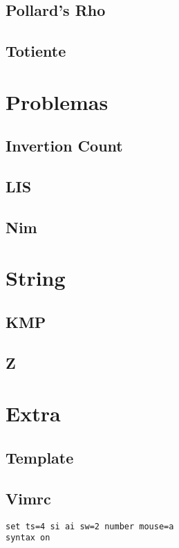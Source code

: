 \documentclass[12pt, a4paper, twoside]{article}
\begin{document}
\subsection{Pollard's Rho}


\subsection{Totiente}




%
%

\section{Problemas}

\subsection{Invertion Count}


\subsection{LIS}


\subsection{Nim}




%
%

\section{String}

\subsection{KMP}


\subsection{Z}




%
%

\section{Extra}

\subsection{Template}


\subsection{Vimrc}
\begin{lstlisting}
set ts=4 si ai sw=2 number mouse=a
syntax on
\end{lstlisting}
\end{document}
